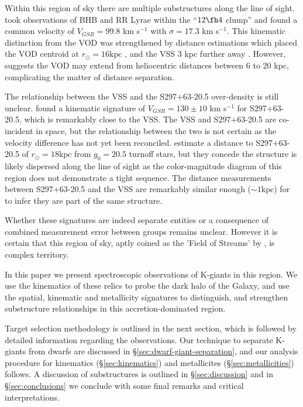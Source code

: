 \documentclass{emulateapj}
\begin{document}
	
	Within this region of sky there are multiple substructures along the line of sight. \citet{Duffau;et-al_2006} took observations of BHB and RR Lyrae within the ``$12\fh4$ clump'' and found a common velocity of $V_{GSR} = 99.8$ km s$^{-1}$ with $\sigma = 17.3$ km s$^{-1}$. This kinematic distinction from the VOD was strengthened by distance estimations which placed the VOD centroid at $r_{\odot} = 16 \text{kpc}$ \citep{Juric;et-al_2008, Keller_2010}, and the VSS 3 kpc further away \citep{Duffau;et-al_2006}. However, \citet{Juric;et-al_2008} suggests the VOD may extend from heliocentric distances between 6 to 20 kpc, complicating the matter of distance separation.
 
 
	The relationship between the VSS and the S297+63-20.5 over-density is still unclear. \citet{Newberg;et-al_2007} found a kinematic signature of $V_{GSR} = 130 \pm 10$ km s$^{-1}$ for S297+63-20.5, which is remarkably close to the VSS. The VSS and S297+63-20.5 are co-incident in space, but the relationship between the two is not certain as the velocity difference has not yet been reconciled. \citet{Newberg;et-al_2007} estimate a distance to S297+63-20.5 of $r_{\odot} = 18 \text{kpc}$ from $g_0 = 20.5$ turnoff stars, but they concede the structure is likely dispersed along the line of sight as the color-magnitude diagram of this region does not demonstrate a tight sequence. The distance measurements between S297+63-20.5 and the VSS are remarkably similar enough ($\sim1 \text{kpc}$) for \citet{Newberg;et-al_2007,Prior;et-al_2009a} to infer they are part of the same structure.
	
	Whether these signatures are indeed separate entities or a consequence of combined measurement error between groups remains unclear. However it is certain that this region of sky, aptly coined as the 'Field of Streams' by \citet{Belokurov;et-al_2006}, is complex territory.
	
	In this paper we present spectroscopic observations of K-giants in this region. We use the kinematics of these relics to probe the dark halo of the Galaxy, and use the spatial, kinematic and metallicity signatures to distinguish, and strengthen substructure relationships in this accretion-dominated region.	

	Target selection methodology is outlined in the next section, which is followed by detailed information regarding the observations. Our technique to separate K-giants from dwarfs are discussed in \S\ref{sec:dwarf-giant-separation}, and our analysis procedure for kinematics (\S\ref{sec:kinematics}) and metallicites (\S\ref{sec:metallicities}) follows. A discussion of substructures is outlined in \S\ref{sec:discussion} and in \S\ref{sec:conclusions} we conclude with some final remarks and critical interpretations. 
		
\end{document}
